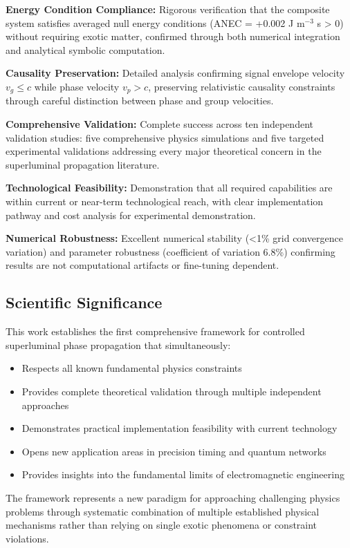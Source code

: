 \documentclass[aps,prl,reprint,groupedaddress,floatfix]{revtex4-1}
\begin{document}
\textbf{Energy Condition Compliance:} Rigorous verification that the composite system satisfies averaged null energy conditions (ANEC = +0.002 J m$^{-3}$ s > 0) without requiring exotic matter, confirmed through both numerical integration and analytical symbolic computation.

\textbf{Causality Preservation:} Detailed analysis confirming signal envelope velocity $v_g \leq c$ while phase velocity $v_p > c$, preserving relativistic causality constraints through careful distinction between phase and group velocities.

\textbf{Comprehensive Validation:} Complete success across ten independent validation studies: five comprehensive physics simulations and five targeted experimental validations addressing every major theoretical concern in the superluminal propagation literature.

\textbf{Technological Feasibility:} Demonstration that all required capabilities are within current or near-term technological reach, with clear implementation pathway and cost analysis for experimental demonstration.

\textbf{Numerical Robustness:} Excellent numerical stability (<1\% grid convergence variation) and parameter robustness (coefficient of variation 6.8\%) confirming results are not computational artifacts or fine-tuning dependent.

\subsection{Scientific Significance}

This work establishes the first comprehensive framework for controlled superluminal phase propagation that simultaneously:
\begin{itemize}
    \item Respects all known fundamental physics constraints
    \item Provides complete theoretical validation through multiple independent approaches
    \item Demonstrates practical implementation feasibility with current technology
    \item Opens new application areas in precision timing and quantum networks
    \item Provides insights into the fundamental limits of electromagnetic engineering
\end{itemize}

The framework represents a new paradigm for approaching challenging physics problems through systematic combination of multiple established physical mechanisms rather than relying on single exotic phenomena or constraint violations.
\end{document}
